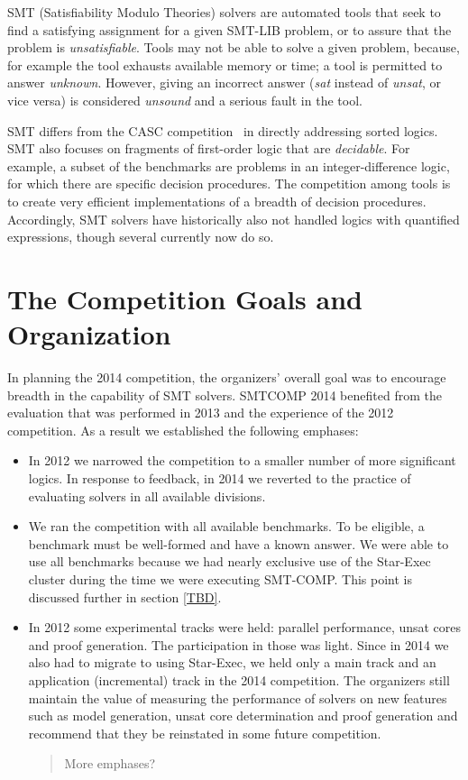 \documentclass[twosize,11pt]{article}
\newcommand{\comment}[2]{\begin{quote}\sc #1\marginpar{\textcolor{red}{$\ast^{\mbox{#2}}$}}\end{quote}}
\newcommand{\davidc}[1]{\comment{#1}{DC}}
\begin{document}
SMT (Satisfiability Modulo Theories) solvers are automated tools that seek to find a satisfying assignment for a given SMT-LIB problem, or to assure that the problem is \textit{unsatisfiable}.
Tools may not be able to solve a given problem, because, for example the tool exhausts available memory or time; a tool is permitted to answer \textit{unknown}. However, giving an incorrect answer (\textit{sat} instead of \textit{unsat}, or vice versa) is considered \textit{unsound} and a serious fault in the tool.

SMT differs from the CASC competition~\cite{PSS02} in directly addressing sorted logics. SMT also focuses on fragments of first-order logic that are \textit{decidable}. For example, a subset of the benchmarks are problems in an integer-difference logic, for which there are specific decision procedures. The competition among tools is to create very efficient implementations of a breadth of decision procedures. Accordingly, SMT solvers have historically also not handled logics with quantified expressions, though several currently now do so.

\section{The Competition Goals and Organization}
\label{sec:goals}

In planning the 2014 competition, the organizers' overall goal was to encourage breadth
in the capability of SMT solvers. SMTCOMP 2014 benefited from the evaluation that was performed in 2013 and the experience of the 2012 competition. As a result we established the following emphases:
\begin{itemize}
\item In 2012 we narrowed the competition to a smaller number of more significant logics. In response to feedback, in 2014 we reverted to the practice of evaluating solvers in all available divisions.
\item We ran the competition with all available benchmarks. To be eligible, a benchmark must be well-formed and have a known answer. We were able to use all benchmarks because we had nearly exclusive use of the Star-Exec cluster during the time we were executing SMT-COMP. This point is discussed further in section \ref{TBD}.
\item In 2012 some experimental tracks were held: parallel performance, unsat cores and proof generation. The participation in those was light. Since in 2014 we also had to migrate to using Star-Exec, we held only a main track and an application (incremental) track in the 2014 competition. The organizers still maintain the value of measuring the performance of solvers on new features such as model generation, unsat core determination and proof generation and recommend that they be reinstated in some future competition.

\davidc{More emphases?}

\end{itemize}
\end{document}
